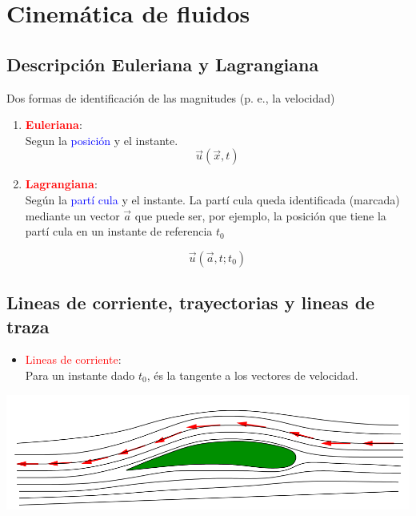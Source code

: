 \chapter{Cinemática de fluidos}
\section{Descripción Euleriana y Lagrangiana}
	
	Dos formas de identificación de las magnitudes (p. e., la velocidad) 
	\begin{enumerate}
		\item {\textbf{\textcolor{red}{Euleriana}}: \\
			Segun la \textcolor{blue}{posición} y el instante. 
		\begin{equation}
			\vec{u}(\vec{x},t)
		\end{equation}
		} 
		\item {\textbf{\textcolor{red}{Lagrangiana}}:\\
			Según la \textcolor{blue}{partí cula} y el instante. La partí cula
			queda identificada (marcada) mediante un vector $\vec{a}$ que puede
			ser, por ejemplo, la posición que tiene la partí cula en un instante
			de referencia $t_{0}$ 
			
\begin{equation}
				\vec{u}(\vec{a},t;t_{0})
\end{equation}
			
		} 
	\end{enumerate}


\section{Lineas de corriente, trayectorias y lineas de traza}

	
	\begin{itemize}
		\item \textcolor{red}{Lineas de corriente}:\\
		Para un instante dado $t_0$, és la tangente a los vectores de velocidad. 
	\end{itemize}

\begin{center}
	\includegraphics[width=0.7\linewidth]{TeX_files/chapter03-Cinematica/lineasCorriente}
\end{center}

